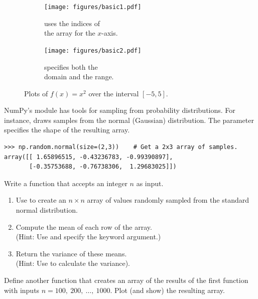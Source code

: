 \begin{figure}[H] %
\captionsetup[subfigure]{justification=centering}
\centering
\begin{subfigure}{.5\textwidth}
    \centering
    \texttt{[image: figures/basic1.pdf]}
    \caption{ uses the indices of\\the array for the $x$-axis.}
    \label{fig:basic1}
\end{subfigure}%
\begin{subfigure}{.5\textwidth}
    \centering
    \texttt{[image: figures/basic2.pdf]}
    \caption{ specifies both the\\domain and the range.}
    \label{fig:basic2}
\end{subfigure}
\caption{Plots of $f(x) = x^2$ over the interval $[-5,5]$.}
\end{figure}

\begin{problem} %
NumPy's  module has tools for sampling from probability distributions.
For instance,  draws samples from the normal (Gaussian) distribution.
The  parameter specifies the shape of the resulting array.
\begin{lstlisting}
>>> np.random.normal(size=(2,3))    # Get a 2x3 array of samples.
array([[ 1.65896515, -0.43236783, -0.99390897],
       [-0.35753688, -0.76738306,  1.29683025]])
\end{lstlisting}
%
Write a function that accepts an integer $n$ as input.
\begin{enumerate}
\item Use  to create an $n\times n$ array of values randomly sampled from the standard normal distribution.
\item Compute the mean of each row of the array.
\\(Hint: Use  and specify the  keyword argument.)
\item Return the variance of these means.
\\(Hint: Use  to calculate the variance).
\end{enumerate}
Define another function that creates an array of the results of the first function with inputs $n = 100,\ 200,\ \ldots,\ 1000$.
Plot (and show) the resulting array.
\end{problem}

